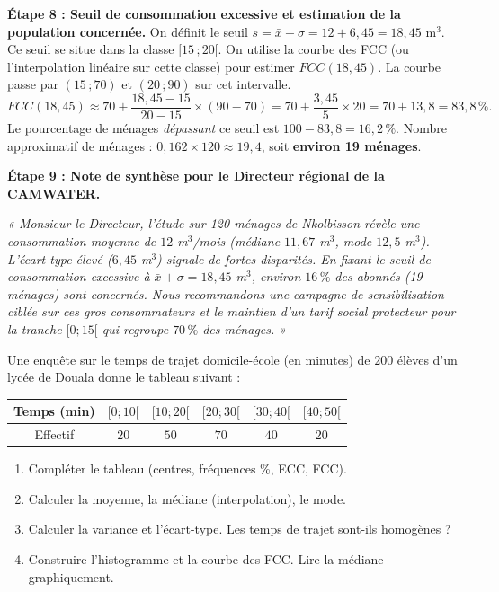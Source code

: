 \documentclass[11pt]{article}
\newcounter{popsec}
\newcounter{popsub}
\newcommand{\courssub}[1]{%
  \stepcounter{popsub}%
  \par\vspace{9pt}\noindent{\popxbold\fontsize{11.5}{13}\selectfont\color{popink}{\color{poporange}\thepopsec.\thepopsub}\hspace{6pt}#1}\par\nopagebreak\vspace{4pt}
}
\begin{document}
\begin{exoresolu}
\textbf{Étape 8 : Seuil de consommation excessive et estimation de la population concernée.}
On définit le seuil $s = \bar{x} + \sigma = 12 + 6,45 = 18,45$ m$^3$.
Ce seuil se situe dans la classe $[15\,;20[$. On utilise la courbe des FCC (ou l'interpolation linéaire sur cette classe) pour estimer $FCC(18,45)$.
La courbe passe par $(15\,;70)$ et $(20\,;90)$ sur cet intervalle.
\[ FCC(18,45) \approx 70 + \frac{18,45 - 15}{20 - 15} \times (90 - 70) = 70 + \frac{3,45}{5} \times 20 = 70 + 13,8 = 83,8\,\%. \]
Le pourcentage de ménages \emph{dépassant} ce seuil est $100 - 83,8 = 16,2\,\%$.
Nombre approximatif de ménages : $0,162 \times 120 \approx 19,4$, soit \textbf{environ 19 ménages}.

\textbf{Étape 9 : Note de synthèse pour le Directeur régional de la CAMWATER.}

\emph{« Monsieur le Directeur, l'étude sur 120 ménages de Nkolbisson révèle une consommation moyenne de $12$ m$^3$/mois (médiane $11,67$ m$^3$, mode $12,5$ m$^3$). L'écart-type élevé ($6,45$ m$^3$) signale de fortes disparités. En fixant le seuil de consommation excessive à $\bar{x}+\sigma = 18,45$ m$^3$, environ $16\,\%$ des abonnés (19 ménages) sont concernés. Nous recommandons une campagne de sensibilisation ciblée sur ces gros consommateurs et le maintien d'un tarif social protecteur pour la tranche $[0;15[$ qui regroupe $70\,\%$ des ménages. »}
\end{exoresolu}

\courssub{Exercices d'application}

\begin{exercice}
Une enquête sur le temps de trajet domicile-école (en minutes) de $200$ élèves d'un lycée de Douala donne le tableau suivant :
\begin{center}
\begin{tabular}{|c|c|c|c|c|c|}\hline
\rowcolor{popblueL} Temps (min) & $[0;10[$ & $[10;20[$ & $[20;30[$ & $[30;40[$ & $[40;50[$ \\ \hline
Effectif & $20$ & $50$ & $70$ & $40$ & $20$ \\ \hline
\end{tabular}
\end{center}
\begin{enumerate}
\item Compléter le tableau (centres, fréquences \%, ECC, FCC).
\item Calculer la moyenne, la médiane (interpolation), le mode.
\item Calculer la variance et l'écart-type. Les temps de trajet sont-ils homogènes ?
\item Construire l'histogramme et la courbe des FCC. Lire la médiane graphiquement.
\end{enumerate}
\end{exercice}
\end{document}
